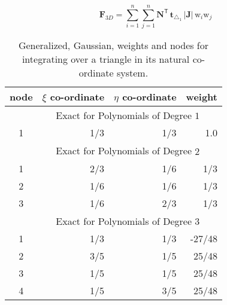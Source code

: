 \begin{equation}
\mathbf{F}_{3D} = \sum_{i=1}^{n} \sum_{j=1}^{n} \mathbf{N}^{\mathsf{T}} \, \mathbf{t}_{\triangle_{1}} \,|\mathbf{J}| \, \mathrm{w}_i \mathrm{w}_j 
\end{equation}



\begin{table}
	\centering
	\begin{tabular}{|c|rrr|}
		\hline
		node & $\xi$ co-ordinate   & 
		$\eta$ co-ordinate & weight \\   \hline        
		& \multicolumn{3}{|c|}{Exact for Polynomials of Degree $1^{\phantom{|^|}}$} \\ 
		\hline
		1 & 1/3 & 1/3 & 1.0 \\ 
		\hline
		& \multicolumn{3}{|c|}{Exact for Polynomials of Degree $2^{\phantom{|^|}}$} \\ 
		\hline
		1 & 2/3 & 1/6 & 1/3\\
		2 & 1/6 & 1/6 & 1/3\\
		3 & 1/6 & 2/3 & 1/3\\ 
		\hline
		& \multicolumn{3}{|c|}{Exact for Polynomials of Degree $3^{\phantom{|^|}}$} \\ \hline
		1 & 1/3 & 1/3 & -27/48 \\
		2 & 3/5 & 1/5 & 25/48 \\
		3 & 1/5 & 1/5 & 25/48 \\ 
		4 & 1/5 & 3/5 & 25/48 \\
		\hline
	\end{tabular}
	\caption{Generalized, Gaussian, weights and nodes for integrating over a triangle in its natural co-ordinate system.}
	\label{tabGaussPointsTriangle}
\end{table}
